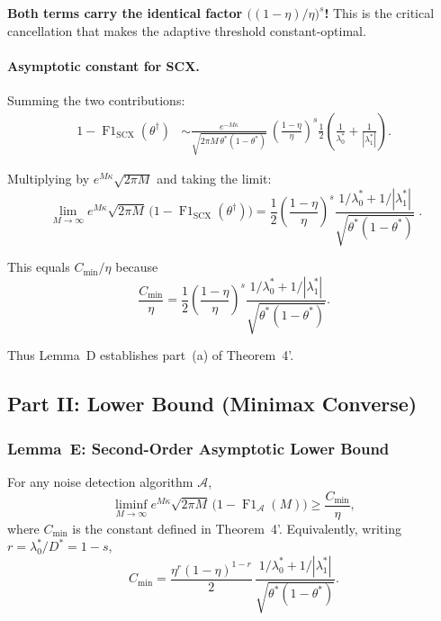 \textbf{Both terms carry the identical factor
$\bigl((1-\eta)/\eta\bigr)^s$!}  This is the critical cancellation that
makes the adaptive threshold constant-optimal.

\paragraph{Asymptotic constant for SCX.}

Summing the two contributions:
\[
\begin{aligned}
1-\operatorname{F1}_{\text{SCX}}(\theta^\dagger)
&\sim \frac{e^{-M\kappa}}
          {\sqrt{2\pi M\,\theta^*(1-\theta^*)}}\,
      \left(\frac{1-\eta}{\eta}\right)^{\!s}
      \frac12\!\left(
        \frac1{\lambda_0^*} + \frac1{|\lambda_1^*|}
      \right).
\end{aligned}
\]

Multiplying by $e^{M\kappa}\sqrt{2\pi M}$ and taking the limit:
\[
\boxed{\;
\lim_{M\to\infty}
  e^{M\kappa}\sqrt{2\pi M}\,
  \bigl(1-\operatorname{F1}_{\text{SCX}}(\theta^\dagger)\bigr)
= \frac12\left(\frac{1-\eta}{\eta}\right)^{\!s}
  \frac{1/\lambda_0^* + 1/|\lambda_1^*|}
       {\sqrt{\theta^*(1-\theta^*)}}\;}.
\]

This equals $C_{\min}/\eta$ because
\[
\frac{C_{\min}}{\eta}
= \frac12\left(\frac{1-\eta}{\eta}\right)^{\!s}
  \frac{1/\lambda_0^* + 1/|\lambda_1^*|}
       {\sqrt{\theta^*(1-\theta^*)}}.
\]

Thus Lemma~D establishes part~(a) of Theorem~4'.

\subsection{Part II: Lower Bound (Minimax Converse)}
\label{sec:thm4_lower}

\subsubsection{Lemma~E: Second-Order Asymptotic Lower Bound}
\label{sec:lemmaE}

\begin{lemma}
  \label{lem:lowerbound}
  For any noise detection algorithm $\mathcal{A}$,
  \[
  \liminf_{M\to\infty}
    e^{M\kappa}\sqrt{2\pi M}\,
    \bigl(1-\operatorname{F1}_{\mathcal{A}}(M)\bigr)
  \ge \frac{C_{\min}}{\eta},
  \]
  where $C_{\min}$ is the constant defined in Theorem~4'.
  Equivalently, writing $r=\lambda_0^*/D^*=1-s$,
  \[
  C_{\min}
  = \frac{\eta^r(1-\eta)^{1-r}}2\,
    \frac{1/\lambda_0^*+1/|\lambda_1^*|}
         {\sqrt{\theta^*(1-\theta^*)}}.
  \]
\end{lemma}

